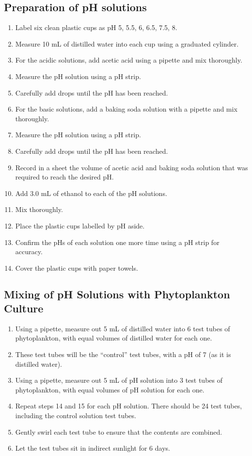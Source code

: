 \documentclass[a4paper]{article}
\begin{document}
\subsection*{Preparation of pH solutions}
\begin{enumerate}
\item Label six clean plastic cups as pH 5, 5.5, 6, 6.5, 7.5, 8.
\item Measure 10 mL of distilled water into each cup using a graduated cylinder.
\item For the acidic solutions, add acetic acid using a pipette and mix thoroughly.
\item Measure the pH solution using a pH strip.
\item Carefully add drops until the pH has been reached.
\item For the basic solutions, add a baking soda solution with a pipette and mix thoroughly.
\item Measure the pH solution using a pH strip.
\item Carefully add drops until the pH has been reached.
\item Record in a sheet the volume of acetic acid and baking soda solution that was required to reach the desired pH. 
\item Add 3.0 mL of ethanol to each of the pH solutions.
\item Mix thoroughly.
\item Place the plastic cups labelled by pH aside.
\item Confirm the pHs of each solution one more time using a pH strip for accuracy.
\item Cover the plastic cups with paper towels.
\end{enumerate}
\subsection*{Mixing of pH Solutions with Phytoplankton Culture}
\begin{enumerate}
\item Using a pipette, measure out 5 mL of distilled water into 6 test tubes of phytoplankton, with equal volumes of distilled water for each one.
\item These test tubes will be the “control” test tubes, with a pH of 7 (as it is distilled water).
\item Using a pipette, measure out 5 mL of pH solution into 3 test tubes of phytoplankton, with equal volumes of pH solution for each one.
\item Repeat steps 14 and 15 for each pH solution. There should be 24 test tubes, including the control solution test tubes.
\item Gently swirl each test tube to ensure that the contents are combined. 
\item Let the test tubes sit in indirect sunlight for 6 days.
\end{enumerate}
\end{document}
